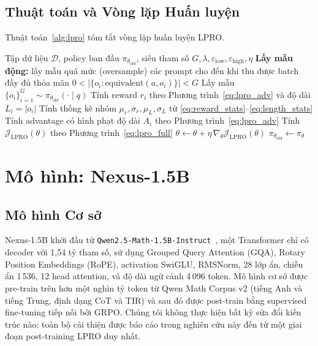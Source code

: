 \documentclass[11pt,a4paper]{article}
\begin{document}
\subsection{Thuật toán và Vòng lặp Huấn luyện}

Thuật toán~\ref{alg:lpro} tóm tắt vòng lặp huấn luyện LPRO.

\begin{algorithm}[h]
\caption{Length-Penalized Reward Optimization (LPRO)}
\label{alg:lpro}
\begin{algorithmic}[1]
\Require Tập dữ liệu \(\mathcal{D}\), policy ban đầu \(\pi_{\theta_{\text{old}}}\),
         siêu tham số \(G,\lambda,\varepsilon_{\text{low}},\varepsilon_{\text{high}},\eta\)
  \State \textbf{Lấy mẫu động:} lấy mẫu quá mức (oversample) các prompt cho đến khi thu được batch đầy đủ thỏa mãn
        \(0<\bigl|\{o_i:\text{equivalent}(a,o_i)\}\bigr|<G\)
    \State Lấy mẫu \(\{o_i\}_{i=1}^G \sim \pi_{\theta_{\text{old}}}(\cdot\mid q)\)
    \State Tính reward \(r_i\) theo Phương trình~\eqref{eq:lpro_adv} và độ dài \(L_i = |o_i|\)
    \State Tính thống kê nhóm \(\mu_r,\sigma_r,\mu_L,\sigma_L\) từ \eqref{eq:reward_stats}--\eqref{eq:length_stats}
    \State Tính advantage có hình phạt độ dài \(A_i\) theo Phương trình~\eqref{eq:lpro_adv}
  \EndFor
    \State Tính \(\mathcal{J}_{\text{LPRO}}(\theta)\) theo Phương trình~\eqref{eq:lpro_full}
    \State \(\theta \leftarrow \theta + \eta\,\nabla_\theta\mathcal{J}_{\text{LPRO}}(\theta)\)
  \EndFor
  \State \(\pi_{\theta_{\text{old}}} \leftarrow \pi_\theta\)
\EndFor
\end{algorithmic}
\end{algorithm}

\section{Mô hình: Nexus-1.5B}

\subsection{Mô hình Cơ sở}

Nexus-1.5B khởi đầu từ \texttt{Qwen2.5-Math-1.5B-Instruct}~\citep{yang2024qwen25math},
một Transformer chỉ có decoder với 1,54 tỷ tham số, sử dụng Grouped Query Attention (GQA),
Rotary Position Embeddings (RoPE), activation SwiGLU, RMSNorm, 28 lớp ẩn,
chiều ẩn 1\,536, 12 head attention, và độ dài ngữ cảnh 4\,096
token. Mô hình cơ sở được pre-train trên hơn một nghìn tỷ token từ
Qwen Math Corpus v2 (tiếng Anh và tiếng Trung, định dạng CoT và TIR) và sau đó
được post-train bằng supervised fine-tuning tiếp nối bởi GRPO. Chúng tôi không thực hiện
bất kỳ sửa đổi kiến trúc nào: toàn bộ cải thiện được báo cáo trong nghiên cứu này
đến từ một giai đoạn post-training LPRO duy nhất.
\end{document}
